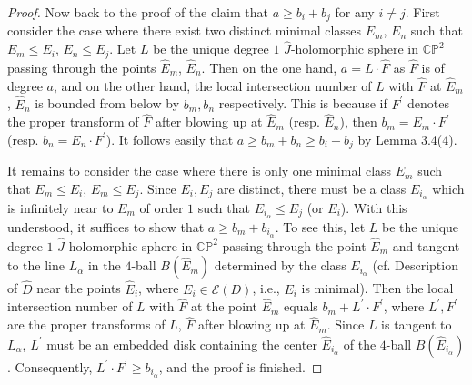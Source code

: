 \documentclass[10pt,a4paper]{amsart}
\newcommand{\C}{{\mathbb C}}
\newcommand{\E}{{\mathcal E}}
\renewcommand{\P}{{\mathbb P}}
\begin{document}
\begin{proof}
Now back to the proof of the claim that $a\geq b_{i}+b_{j}$ for any $i\neq j$. First consider the case where
there exist two distinct minimal classes $E_m$, $E_n$ such that $E_m\leq E_i$, $E_n\leq E_j$.
Let $L$ be the unique degree $1$ $\hat{J}$-holomorphic sphere in $\C\P^2$ passing through 
the points $\hat{E}_m$, $\hat{E}_n$. Then on the one hand, $a=L\cdot \hat{F}$ as $\hat{F}$ is of
degree $a$, and on the other hand, the local intersection number of $L$ with $\hat{F}$ at
$\hat{E}_m$, $\hat{E}_n$ is bounded from below by $b_m, b_n$ respectively. This is because if 
$F^\prime$ denotes the proper transform of $\hat{F}$ after blowing up at $\hat{E}_m$ (resp. 
$\hat{E}_n$), then $b_m=E_m\cdot F^\prime$ (resp. $b_n=E_n\cdot F^\prime$). It follows easily that
$a\geq b_m+b_n\geq b_i+b_j$ by Lemma 3.4(4). 

It remains to consider the case where there is only one minimal class $E_m$ such that $E_m\leq E_i$,
$E_m\leq E_j$. Since $E_i,E_j$ are distinct, there must be a class $E_{i_\alpha}$ which is infinitely near 
to $E_m$ of order $1$ such that $E_{i_\alpha}\leq E_j$ (or $E_i$). With this understood, it suffices to
show that $a\geq b_m+b_{i_\alpha}$. To see this, let $L$ be the unique degree $1$ $\hat{J}$-holomorphic 
sphere in $\C\P^2$ passing through the point $\hat{E}_m$ and tangent to the line $L_\alpha$ in the $4$-ball $B(\hat{E}_m)$ determined by the class $E_{i_\alpha}$ (cf. Description of $\hat{D}$ near the points $\hat{E}_i$, where $E_i\in\E(D)$, i.e., $E_i$ is minimal). Then the local intersection number of $L$ with $\hat{F}$ at the 
point $\hat{E}_m$ equals $b_m+L^\prime\cdot F^\prime$, where $L^\prime,F^\prime$ are the proper transforms of $L$, $\hat{F}$ after blowing up at $\hat{E}_m$. Since $L$ is tangent to $L_\alpha$, $L^\prime$ must be an embedded disk containing 
the center $\hat{E}_{i_\alpha}$ of the $4$-ball $B(\hat{E}_{i_\alpha})$. Consequently, 
$L^\prime\cdot F^\prime\geq b_{i_\alpha}$, and the proof is finished. 
\end{proof}
\end{document}
